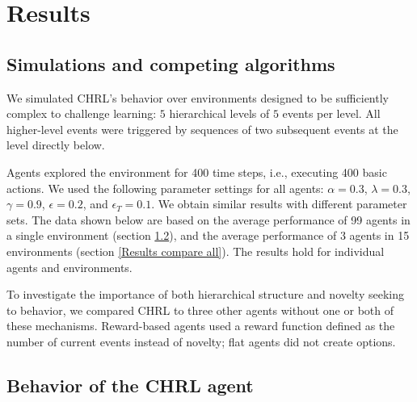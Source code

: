 \documentclass{article}
\begin{document}
\section{Results}

\subsection{Simulations and competing algorithms} \label{Comparison agents}

We simulated CHRL's behavior over environments designed to be sufficiently complex to challenge learning: $5$ hierarchical levels of $5$ events per level. All higher-level events were triggered by sequences of two subsequent events at the level directly below.%

Agents explored the environment for 400 time steps, i.e., executing 400 basic actions. We used the following parameter settings for all agents: $\alpha = 0.3$, $\lambda = 0.3$, $\gamma = 0.9$, $\epsilon = 0.2$, and $\epsilon_T = 0.1$. We obtain similar results with different parameter sets. The data shown below are based on the average performance of 99 agents in a single environment (section \ref{Results CHRL}), and the average performance of 3 agents in 15 environments (section \ref{Results compare all}). The results hold for individual agents and environments.

To investigate the importance of both hierarchical structure and novelty seeking to behavior, we compared CHRL to three other agents without one or both of these mechanisms. Reward-based agents used a reward function defined as the number of current events instead of novelty; flat agents did not create options.%

\subsection{Behavior of the CHRL agent} \label{Results CHRL}
\end{document}
